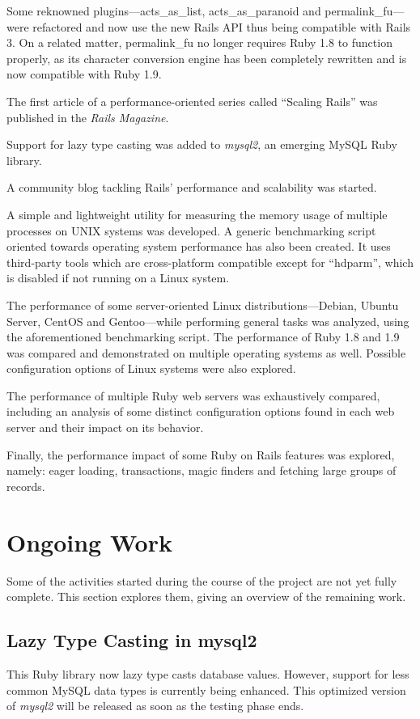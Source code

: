 Some reknowned plugins---acts\_as\_list, acts\_as\_paranoid and permalink\_fu---were refactored and now use the new Rails API thus being compatible with Rails 3. On a related matter, permalink\_fu no longer requires Ruby 1.8 to function properly, as its character conversion engine has been completely rewritten and is now compatible with Ruby 1.9.

The first article of a performance-oriented series called ``Scaling Rails'' was published in the \textit{Rails Magazine}.

Support for lazy type casting was added to \textit{mysql2}, an emerging MySQL Ruby library.

A community blog tackling Rails' performance and scalability was started.

A simple and lightweight utility for measuring the memory usage of multiple processes on UNIX systems was developed. A generic benchmarking script oriented towards operating system performance has also been created. It uses third-party tools which are cross-platform compatible except for ``hdparm'', which is disabled if not running on a Linux system.

The performance of some server-oriented Linux distributions---Debian, Ubuntu Server, CentOS and Gentoo---while performing general tasks was analyzed, using the aforementioned benchmarking script. The performance of Ruby 1.8 and 1.9 was compared and demonstrated on multiple operating systems as well. Possible configuration options of Linux systems were also explored.

The performance of multiple Ruby web servers was exhaustively compared, including an analysis of some distinct configuration options found in each web server and their impact on its behavior.

Finally, the performance impact of some Ruby on Rails features was explored, namely: eager loading, transactions, magic finders and fetching large groups of records.


\section{Ongoing Work}
Some of the activities started during the course of the project are not yet fully complete. This section explores them, giving an overview of the remaining work.

\subsection{Lazy Type Casting in mysql2}
This Ruby library now lazy type casts database values. However, support for less common MySQL data types is currently being enhanced. This optimized version of \textit{mysql2} will be released as soon as the testing phase ends.

